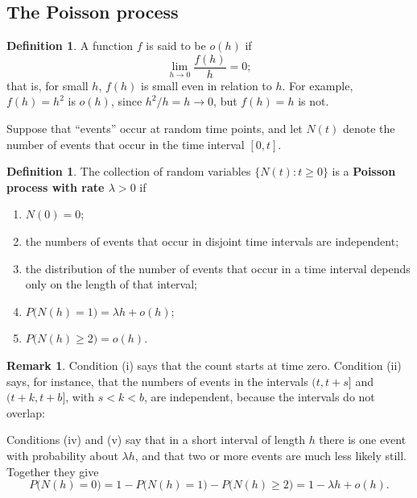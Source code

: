 \documentclass[11pt,a4paper]{article}
\theoremstyle{definition}
\newtheorem{defn}[thm]{Definition}
\newtheorem*{remark}{Remark}
\begin{document}
\subsection{The Poisson process}
\begin{defn}
A function $f$ is said to be $o(h)$ if
\[
\lim_{h\to 0}\frac{f(h)}{h} = 0 ;
\]
that is, for small $h$, $f(h)$ is small even in relation to $h$. For example, $f(h) = h^2$ is $o(h)$, since $h^2/h = h \to 0$, but $f(h) = h$ is not.
\end{defn}

Suppose that ``events'' occur at random time points, and let $N(t)$ denote the number of events that occur in the time interval $[0, t]$.

\begin{defn}\label{defn:poisson-process}
The collection of random variables $\{N(t) : t \ge 0\}$ is a \textbf{Poisson process with rate $\lambda > 0$} if
\begin{enumerate}[label=(\roman*)]
\item $N(0) = 0$;
\item the numbers of events that occur in disjoint time intervals are independent;
\item the distribution of the number of events that occur in a time interval depends only on the length of that interval;
\item $P\bigl(N(h) = 1\bigr) = \lambda h + o(h)$;
\item $P\bigl(N(h) \ge 2\bigr) = o(h)$.
\end{enumerate}
\end{defn}

\begin{remark}
Condition (i) says that the count starts at time zero. Condition (ii) says, for instance, that the numbers of events in the intervals $(t, t + s]$ and
$(t + k, t + b]$, with $s < k < b$, are independent, because the intervals do not overlap:

\begin{figure}[H]
\centering
{}
\end{figure}

Conditions (iv) and (v) say that in a short interval of length $h$ there is one event with probability about $\lambda h$, and that two or more events are
much less likely still. Together they give
\[
P\bigl(N(h) = 0\bigr) = 1 - P\bigl(N(h) = 1\bigr) - P\bigl(N(h) \ge 2\bigr) = 1 - \lambda h + o(h) .
\]
\end{remark}
\end{document}
